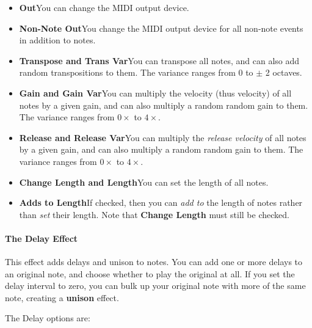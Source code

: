 \documentclass[twoside,10pt]{article}
\begin{document}
\begin{itemize}
\item {\bf Out}\qquad You can change the MIDI output device.
\item {\bf Non-Note Out}\qquad You change the MIDI output device for all non-note events in addition to notes.
\item {\bf Transpose and Trans Var}\qquad You can transpose all notes, and can also add random transpositions to them.  The variance ranges from \(0\) to \(\pm\) 2 octaves.
\item {\bf Gain and Gain Var}\qquad You can multiply the velocity (thus velocity) of all notes by a given gain, and can also multiply a random random gain to them.  The variance ranges from \(0\times\) to \(4\times\).
\item {\bf Release and Release Var}\qquad You can multiply the {\it release velocity} of all notes by a given gain, and can also multiply a random random gain to them.  The variance ranges from \(0\times\) to \(4\times\).
\item {\bf Change Length and Length}\qquad You can set the length of all notes.
\item {\bf Adds to Length}\qquad If checked, then you can {\it add to} the length of notes rather than {\it set} their length.  Note that {\bf Change Length} must still be checked. 
\end{itemize}

\paragraph{The Delay Effect}

This effect adds delays and unison to notes.  You can add one or more delays to an original note, and choose whether to play the original at all.  If you set the delay interval to zero, you can bulk up your original note with more of the same note, creating a {\bf unison} effect.

The Delay options are:
\end{document}
